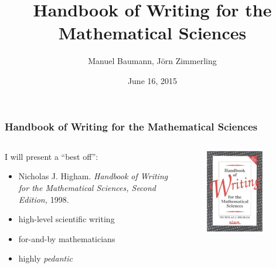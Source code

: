 \documentclass{beamer}
\title{\bf Handbook of Writing for the \\ Mathematical Sciences}
\author{Manuel Baumann, J\"orn Zimmerling}
\date{\footnotesize{June 16, 2015}}
\begin{document}
\frame{\titlepage}
\begin{frame}
\frametitle{Handbook of Writing for the Mathematical Sciences}
\begin{columns}
 \begin{column}{0.6\textwidth}
I will present a ``best off'':

 \begin{itemize}
  \item Nicholas J. Higham. \emph{Handbook of Writing for the Mathematical Sciences, Second Edition,} 1998.
  \item high-level scientific writing
  \item for-and-by mathematicians
  \item highly \textit{pedantic}
 \end{itemize}
 \end{column}

 \begin{column}{0.4\textwidth}
  \begin{figure}[t]
  \centering
  \includegraphics[width=0.8\textwidth]{images/book_cover.jpg}
  \end{figure}
 \end{column}
 \end{columns}
 
\end{frame}
\end{document}
